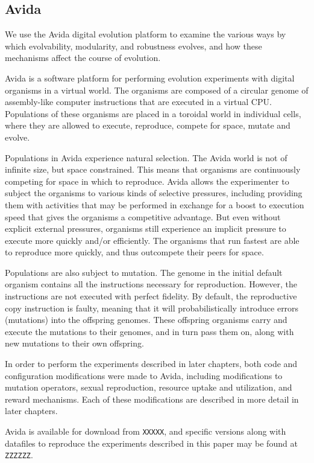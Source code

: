 \subsection{Avida}

We use the Avida digital evolution platform to examine the various ways by which evolvability, modularity, and robustness evolves, and how these mechanisms affect the course of evolution.

Avida is a software platform for performing evolution experiments with digital organisms in a virtual world. The organisms are composed of a circular genome of assembly-like computer instructions that are executed in a virtual CPU. Populations of these organisms are placed in a toroidal world in individual cells, where they are allowed to execute, reproduce, compete for space, mutate and evolve. 
 
Populations in Avida experience natural selection. The Avida world is not of infinite size, but space constrained. This means that organisms are continuously competing for space in which to reproduce.  Avida allows the experimenter to subject the organisms to various kinds of selective pressures, including providing them with activities that may be performed in exchange for a boost to execution speed that gives the organisms a competitive advantage. But even without explicit external pressures, organisms still experience an implicit pressure to execute more quickly and/or efficiently. The organisms that run fastest are able to reproduce more quickly, and thus outcompete their peers for space.  

Populations are also subject to mutation. The genome in the initial default organism contains all the instructions necessary for reproduction. However, the instructions are not executed with perfect fidelity. By default, the reproductive copy instruction is faulty, meaning that it will probabilistically introduce errors (mutations) into the offspring genomes. These offspring organisms carry and execute the mutations to their genomes, and in turn pass them on, along with new mutations to their own offspring.

In order to perform the experiments described in later chapters, both code and configuration modifications were made to Avida, including modifications to mutation operators, sexual reproduction, resource uptake and utilization, and reward mechanisms. Each of these modifications are described in more detail in later chapters.

Avida is available for download from \verb|XXXXX|, and specific versions along with datafiles to reproduce the experiments described in this paper may be found at \verb|ZZZZZZ|.